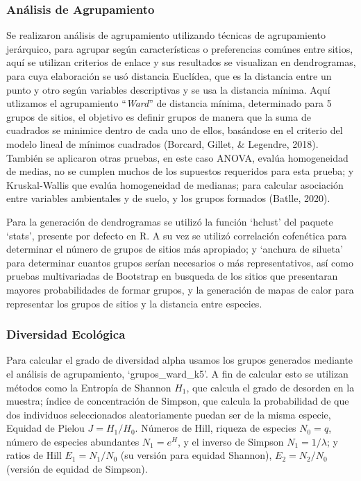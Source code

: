 \documentclass[11pt,]{article}
\begin{document}
\subsubsection{Análisis de
Agrupamiento}\label{anuxe1lisis-de-agrupamiento}

Se realizaron análisis de agrupamiento utilizando técnicas de
agrupamiento jerárquico, para agrupar según características o
preferencias comúnes entre sitios, aquí se utilizan criterios de enlace
y sus resultados se visualizan en dendrogramas, para cuya elaboración se
usó distancia Euclídea, que es la distancia entre un punto y otro según
variables descriptivas y se usa la distancia mínima. Aquí utlizamos el
agrupamiento ``\emph{Ward}'' de distancia mínima, determinado para 5
grupos de sitios, el objetivo es definir grupos de manera que la suma de
cuadrados se minimice dentro de cada uno de ellos, basándose en el
criterio del modelo lineal de mínimos cuadrados (Borcard, Gillet, \&
Legendre, 2018). También se aplicaron otras pruebas, en este caso ANOVA,
evalúa homogeneidad de medias, no se cumplen muchos de los supuestos
requeridos para esta prueba; y Kruskal-Wallis que evalúa homogeneidad de
medianas; para calcular asociación entre variables ambientales y de
suelo, y los grupos formados (Batlle, 2020).

Para la generación de dendrogramas se utilizó la función `hclust' del
paquete `stats', presente por defecto en R. A su vez se utilizó
correlación cofenética para determinar el número de grupos de sitios más
apropiado; y `anchura de silueta' para determinar cuantos grupos serían
necesarios o más representativos, así como pruebas multivariadas de
Bootstrap en busqueda de los sitios que presentaran mayores
probabilidades de formar grupos, y la generación de mapas de calor para
representar los grupos de sitios y la distancia entre especies.

\subsubsection{Diversidad Ecológica}\label{diversidad-ecoluxf3gica}

Para calcular el grado de diversidad alpha usamos los grupos generados
mediante el análisis de agrupamiento, `grupos\_ward\_k5'. A fin de
calcular esto se utilizan métodos como la Entropía de Shannon \(H_1\),
que calcula el grado de desorden en la muestra; índice de concentración
de Simpson, que calcula la probabilidad de que dos individuos
seleccionados aleatoriamente puedan ser de la misma especie, Equidad de
Pielou \(J=H_1/H_0\). Números de Hill, riqueza de especies \(N_0=q\),
número de especies abundantes \(N_1=e^H\), y el inverso de Simpson
\(N_1=1/\lambda\); y ratios de Hill \(E_1=N_1/N_0\) (su versión para
equidad Shannon), \(E_2=N_2/N_0\) (versión de equidad de Simpson).
\end{document}

